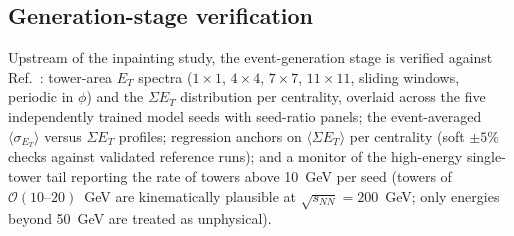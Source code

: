 \subsection{Generation-stage verification}
\label{sec:validation:generation}

Upstream of the inpainting study, the event-generation stage is verified
against Ref.~\cite{torbunov2024calo}: tower-area $E_T$ spectra
($1{\times}1$, $4{\times}4$, $7{\times}7$, $11{\times}11$, sliding
windows, periodic in $\phi$) and the $\Sigma E_T$ distribution per
centrality, overlaid across the five independently trained model seeds
with seed-ratio panels; the event-averaged
$\langle \sigma_{E_T}\rangle$ versus $\Sigma E_T$ profiles; regression
anchors on $\langle \Sigma E_T \rangle$ per centrality (soft $\pm 5\%$
checks against validated reference runs); and a monitor of the
high-energy single-tower tail reporting the rate of towers above
10~GeV per seed (towers of $\mathcal{O}(10\text{--}20)$~GeV are
kinematically plausible at $\sqrt{s_{NN}} = 200$~GeV; only energies
beyond 50~GeV are treated as unphysical).
